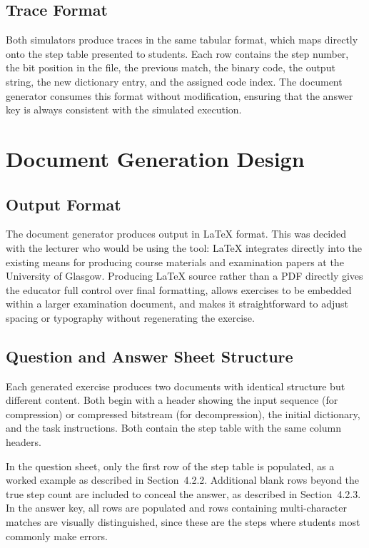 \documentclass{l4proj}
\begin{document}
\subsection{Trace Format}

Both simulators produce traces in the same tabular format, which maps directly onto the step table presented to students. Each row contains the step number, the bit position in the file, the previous match, the binary code, the output string, the new dictionary entry, and the assigned code index. The document generator consumes this format without modification, ensuring that the answer key is always consistent with the simulated execution.

\section{Document Generation Design}

\subsection{Output Format}

The document generator produces output in LaTeX format. This was decided with the lecturer who would be using the tool: LaTeX integrates directly into the existing means for producing course materials and examination papers at the University of Glasgow. Producing LaTeX source rather than a PDF directly gives the educator full control over final formatting, allows exercises to be embedded within a larger examination document, and makes it straightforward to adjust spacing or typography without regenerating the exercise.

\subsection{Question and Answer Sheet Structure}

Each generated exercise produces two documents with identical structure but different content. Both begin with a header showing the input sequence (for compression) or compressed bitstream (for decompression), the initial dictionary, and the task instructions. Both contain the step table with the same column headers.

In the question sheet, only the first row of the step table is populated, as a worked example as described in Section~4.2.2. Additional blank rows beyond the true step count are included to conceal the answer, as described in Section~4.2.3. In the answer key, all rows are populated and rows containing multi-character matches are visually distinguished, since these are the steps where students most commonly make errors.
\end{document}
